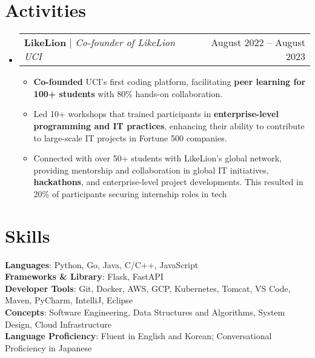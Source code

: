 \documentclass[letterpaper,11pt]{article}
\makeatletter
\newcommand{\resumeItem}[1]{
  \item\small{
    {#1 \vspace{-2pt}}
  }
}
\newcommand{\resumeActivitiesHeading}[2]{
    \item
    \begin{tabular*}{0.97\textwidth}{l@{\extracolsep{\fill}}r}
      \small#1 & #2 \\
    \end{tabular*}\vspace{-7pt}
}
\newcommand{\resumeSubHeadingListStart}{\begin{itemize}[leftmargin=0.15in, label={}]}
\newcommand{\resumeSubHeadingListEnd}{\end{itemize}}
\newcommand{\resumeItemListStart}{\begin{itemize}}
\newcommand{\resumeItemListEnd}{\end{itemize}\vspace{-5pt}}
\makeatother
\begin{document}

%

\section{Activities}
    \resumeSubHeadingListStart
      \resumeActivitiesHeading
          {\textbf{LikeLion} $|$ \emph{Co-founder of LikeLion UCI}}{August 2022 -- August 2023}
          \resumeItemListStart
            \resumeItem{\textbf{Co-founded} UCI’s first coding platform, facilitating \textbf{peer learning for 100+ students} with 80\% hands-on collaboration.}
            \resumeItem{Led 10+ workshops that trained participants in \textbf{enterprise-level programming and IT practices}, enhancing their ability to contribute to large-scale IT projects in Fortune 500 companies.}
            \resumeItem{Connected with over 50+ students with LikeLion's global network, providing mentorship and collaboration in global IT initiatives, \textbf{hackathons}, and enterprise-level project developments. This resulted in 20\% of participants securing internship roles in tech}
          \resumeItemListEnd
    \resumeSubHeadingListEnd

%

\section{Skills}
 \begin{itemize}[leftmargin=0.15in, label={}]
    \small{\item{
     \textbf{Languages}{: Python, Go, Java, C/C++, JavaScript} \\
     \textbf{Frameworks \& Library}{: Flask, FastAPI} \\
     \textbf{Developer Tools}{: Git, Docker, AWS, GCP, Kubernetes, Tomcat, VS Code, Maven, PyCharm, IntelliJ, Eclipse} \\
     \textbf{Concepts}{: Software Engineering, Data Structures and Algorithms, System Design, Cloud Infrastructure}\\
     \textbf{Language Proficiency}{: Fluent in English and Korean; Conversational Proficiency in Japanese}

    }}
 \end{itemize}


\end{document}
